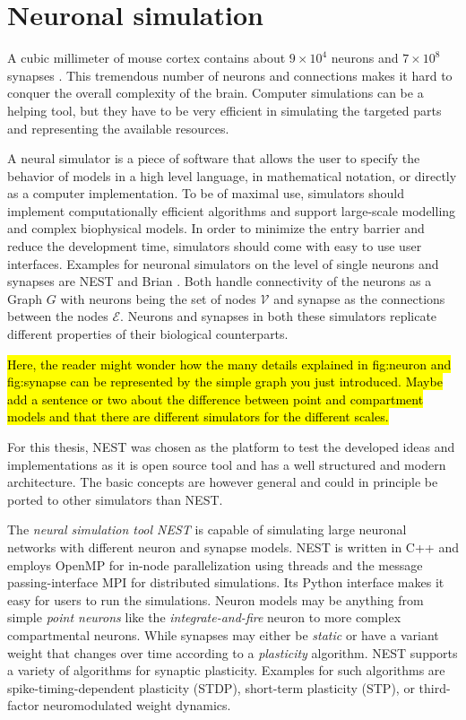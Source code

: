 \section{Neuronal simulation}

A cubic millimeter of mouse cortex contains about $9×10^4$ neurons and $7×10^8$ synapses \citep{faisal2005ion}. This tremendous number of neurons and connections makes it hard to conquer the overall complexity of the brain. Computer simulations can be a helping tool, but they have to be very efficient in simulating the targeted parts and representing the available resources.

A neural simulator is a piece of software that allows the user to specify the behavior of models in a high level language, in mathematical notation, or directly as a computer implementation. To be of maximal use, simulators should implement computationally efficient algorithms and support large-scale modelling and complex biophysical models. In order to minimize the entry barrier and reduce the development time, simulators should come with easy to use user interfaces. Examples for neuronal simulators on the level of single neurons and synapses are NEST \citep{gewaltig2007nest} and Brian \citep{10.3389/neuro.11.005.2008}. Both handle connectivity of the neurons as a Graph $G$ \citep{bondy1976graph} with neurons being the set of nodes $\mathcal{V}$ and synapse as the connections between the nodes $\mathcal{E}$. Neurons and synapses in both these simulators replicate different properties of their biological counterparts.

\hl{Here, the reader might wonder how the many details explained in fig:neuron and fig:synapse can be represented by the simple graph you just introduced. Maybe add a sentence or two about the difference between point and compartment models and that there are different simulators for the different scales.}

For this thesis, NEST was chosen as the platform to test the developed ideas and implementations as it is open source tool and has a well structured and modern architecture. The basic concepts are however general and could in principle be ported to other simulators than NEST.

The \emph{neural simulation tool NEST} \citep{gewaltig2007nest, spreizer_sebastian_2022_6368024} is capable of simulating large neuronal networks with different neuron and synapse models. NEST is written in C++ and employs OpenMP for in-node parallelization using threads and the message passing-interface MPI \citep{clarke1994mpi} for distributed simulations. Its Python interface \citep[\emph{PyNEST};][]{10.3389/neuro.11.012.2008} makes it easy for users to run the simulations. Neuron models may be anything from simple \emph{point neurons} like the \emph{integrate-and-fire} neuron to more complex compartmental neurons. While synapses may either be \emph{static} or have a variant weight that changes over time according to a \emph{plasticity} algorithm. NEST supports a variety of algorithms for synaptic plasticity. Examples for such algorithms are spike-timing-dependent plasticity (STDP), short-term plasticity (STP), or third-factor neuromodulated weight dynamics.

